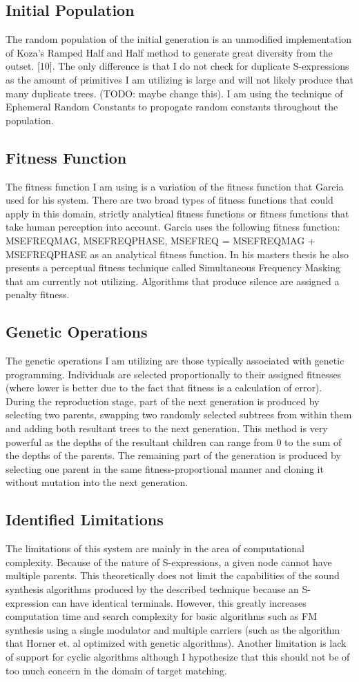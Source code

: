 \documentclass[12pt]{article}
\begin{document}
\subsection{Initial Population}
The random population of the initial generation is an unmodified implementation of Koza's Ramped Half and Half method to generate great diversity from the outset. [10]. The only difference is that I do not check for duplicate S-expressions as the amount of primitives I am utilizing is large and will not likely produce that many duplicate trees. (TODO: maybe change this). I am using the technique of Ephemeral Random Constants to propogate random constants throughout the population.
\subsection{Fitness Function}
The fitness function I am using is a variation of the fitness function that Garcia used for his system. There are two broad types of fitness functions that could apply in this domain, strictly analytical fitness functions or fitness functions that take human perception into account. Garcia uses the following fitness function: MSEFREQMAG, MSEFREQPHASE, MSEFREQ = MSEFREQMAG + MSEFREQPHASE as an analytical fitness function. In his masters thesis he also presents a perceptual fitness technique called Simultaneous Frequency Masking that am currently not utilizing. Algorithms that produce silence are assigned a penalty fitness.
\subsection{Genetic Operations}
The genetic operations I am utilizing are those typically associated with genetic programming. Individuals are selected proportionally to their assigned fitnesses (where lower is better due to the fact that fitness is a calculation of error). During the reproduction stage, part of the next generation is produced by selecting two parents, swapping two randomly selected subtrees from within them and adding both resultant trees to the next generation. This method is very powerful as the depths of the resultant children can range from 0 to the sum of the depths of the parents. The remaining part of the generation is produced by selecting one parent in the same fitness-proportional manner and cloning it without mutation into the next generation.
\subsection{Identified Limitations}
The limitations of this system are mainly in the area of computational complexity. Because of the nature of S-expressions, a given node cannot have multiple parents. This theoretically does not limit the capabilities of the sound synthesis algorithms produced by the described technique because an S-expression can have identical terminals. However, this greatly increases computation time and search complexity for basic algorithms such as FM synthesis using a single modulator and multiple carriers (such as the algorithm that Horner et. al optimized with genetic algorithms). Another limitation is lack of support for cyclic algorithms although I hypothesize that this should not be of too much concern in the domain of target matching.
\end{document}
